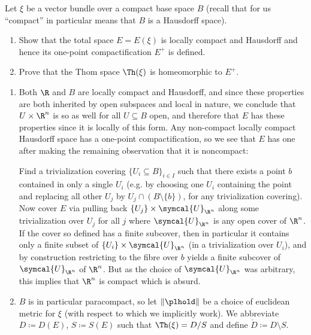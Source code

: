 \begin{exercise}\label{ex:thomspacecompactification}
	Let $\xi$ be a vector bundle over a compact base space $B$ (recall that for us \enquote{compact} in particular means that $B$ is a Hausdorff space).
	\begin{enumerate}
		\item Show that the total space $E = E(\xi)$ is locally compact and Hausdorff and hence its one-point compactification $E^+$ is defined.
		\item Prove that the Thom space $\Th(\xi)$ is homeomorphic to $E^+$.
	\end{enumerate}
\end{exercise}
\begin{solution}
	\leavevmode
	\begin{enumerate}
		\item Both $\R$ and $B$ are locally compact and Hausdorff, and since these properties are both inherited by open subspaces and local in nature, we conclude that $U \times \R^n$ is so as well for all $U \subseteq B$ open, and therefore that $E$ has these properties since it is locally of this form.
			Any non-compact locally compact Hausdorff space has a one-point compactification, so we see that $E$ has one after making the remaining observation that it is noncompact:
			
			Find a trivialization covering $\{U_i \subseteq B\}_{i \in I}$ such that there exists a point $b$ contained in only a single $U_i$ (e.g. by choosing one $U_i$ containing the point and replacing all other $U_j$ by $U_j \cap (B \setminus \{b\})$, for any trivialization covering).
			Now cover $E$ via pulling back $\{U_j\} \times \symcal{U}_{\R^n}$ along some trivialization over $U_j$ for all $j$ where $\symcal{U}_{\R^n}$ is any open cover of $\R^n$.
			If the cover so defined has a finite subcover, then in particular it contains only a finite subset of $\{U_i\} \times \symcal{U}_{\R^n}$ (in a trivialization over $U_i$), and by construction restricting to the fibre over $b$ yields a finite subcover of $\symcal{U}_{\R^n}$ of $\R^n$.
			But as the choice of $\symcal{U}_{\R^n}$ was arbitrary, this implies that $\R^n$ is compact which is absurd.
		\item $B$ is in particular paracompact, so let $\lVert\plhold\rVert$ be a choice of euclidean metric for $\xi$ (with respect to which we implicitly work).
			We abbreviate $D \coloneq D(E)$, $S \coloneq S(E)$ such that $\Th(\xi) = D / S$ and define $\mathring{D} \coloneq D \setminus S$.


\end{enumerate}
\end{solution}
